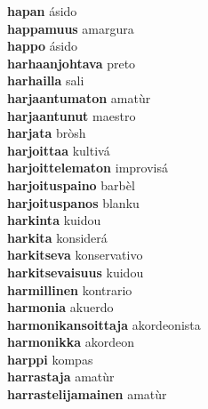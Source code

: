 \textbf{hapan } ásido \\
\textbf{happamuus } amargura \\
\textbf{happo } ásido \\
\textbf{harhaanjohtava } preto \\
\textbf{harhailla } sali \\
\textbf{harjaantumaton } amatùr \\
\textbf{harjaantunut } maestro \\
\textbf{harjata } bròsh \\
\textbf{harjoittaa } kultivá \\
\textbf{harjoittelematon } improvisá \\
\textbf{harjoituspaino } barbèl \\
\textbf{harjoituspanos } blanku \\
\textbf{harkinta } kuidou \\
\textbf{harkita } konsiderá \\
\textbf{harkitseva } konservativo \\
\textbf{harkitsevaisuus } kuidou \\
\textbf{harmillinen } kontrario \\
\textbf{harmonia } akuerdo \\
\textbf{harmonikansoittaja } akordeonista \\
\textbf{harmonikka } akordeon \\
\textbf{harppi } kompas \\
\textbf{harrastaja } amatùr \\
\textbf{harrastelijamainen } amatùr \\
